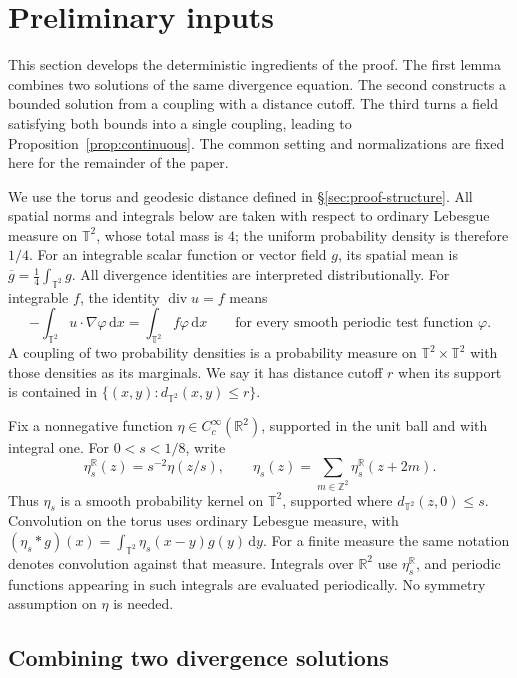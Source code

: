 \documentclass[11pt]{article}
\newcommand{\R}{\mathbb R}
\newcommand{\Z}{\mathbb Z}
\newcommand{\T}{\mathbb T^2}
\newcommand{\diver}{\operatorname{div}}
\theoremstyle{remark}
\numberwithin{equation}{section}
\begin{document}
\section{Preliminary inputs}
\label{sec:preliminaries}

This section develops the deterministic ingredients of the proof. The
first lemma combines two solutions of the same divergence equation.
The second constructs a bounded solution from a coupling with a
distance cutoff. The third turns a field satisfying both bounds into a
single coupling, leading to Proposition~\ref{prop:continuous}.
The common setting and normalizations are fixed here for the remainder
of the paper.

We use the torus and geodesic distance defined in
\S\ref{sec:proof-structure}. All spatial norms and integrals below
are taken with respect to ordinary Lebesgue measure on \(\T\), whose
total mass is \(4\); the uniform probability density is therefore
\(1/4\). For an integrable scalar function or
vector field \(g\), its spatial mean is
\(\overline g=\frac14\int_{\T}g\). All divergence identities are
interpreted distributionally. For integrable \(f\), the identity
\(\diver u=f\) means
\[
 -\int_{\T}u\cdot\nabla\varphi\,\mathrm dx
 =\int_{\T}f\varphi\,\mathrm dx
 \qquad\text{for every smooth periodic test function }\varphi.
\]
A coupling of two probability densities is a probability measure on
\(\T\times\T\) with those densities as its marginals. We say it has
distance cutoff \(r\) when its support is contained in
\(\{(x,y):d_{\T}(x,y)\le r\}\).

Fix a nonnegative function \(\eta\in C_c^\infty(\R^2)\), supported
in the unit ball and with integral one. For \(0<s<1/8\), write
\[
 \eta_s^{\R}(z)=s^{-2}\eta(z/s),\qquad
 \eta_s(z)=\sum_{m\in\Z^2}\eta_s^{\R}(z+2m).
\]
Thus \(\eta_s\) is a smooth probability kernel on \(\T\), supported
where \(d_{\T}(z,0)\le s\). Convolution on the torus uses ordinary
Lebesgue measure, with
\((\eta_s*g)(x)=\int_{\T}\eta_s(x-y)g(y)\,\mathrm dy\).
For a finite measure the same notation denotes convolution against that
measure. Integrals over \(\R^2\) use \(\eta_s^{\R}\), and periodic
functions appearing in such integrals are evaluated periodically.
No symmetry assumption on \(\eta\) is needed.

\subsection{Combining two divergence solutions}
\label{sec:interpolation}
\end{document}
